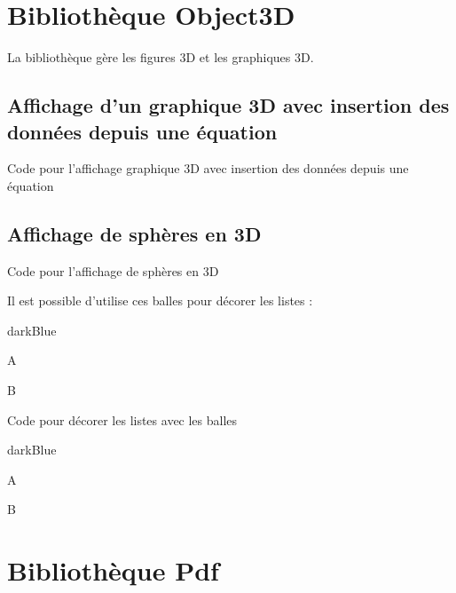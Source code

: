 {


\chapter{Bibliothèque Object3D}

La bibliothèque  gère les figures 3D et les graphiques 3D.

\section{Affichage d'un graphique 3D avec insertion des données depuis une équation}



\begin{Latex}{Code pour l'affichage graphique 3D avec insertion des données depuis une équation}
\end{Latex}

\section{Affichage de sphères en 3D}


\begin{Latex}{Code pour l'affichage de sphères en 3D}
\end{Latex}

Il est possible d'utilise ces balles pour décorer les listes : \\

\begin{items}{darkBlue}{}
    \item A
    \item B
    \end{items}

\begin{Latex}{Code pour décorer les listes avec les balles}
\begin{items}{darkBlue}{}
\item A
\item B
\end{items}
\end{Latex}


\chapter{Bibliothèque Pdf}

}
